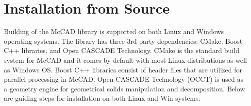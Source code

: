 \documentclass[12pt, a4paper, titlepage]{article}
\begin{document}
\section{Installation from Source} \label{sec:Installation from Source}
Building of the McCAD library is supported on both Linux and Windows operating systems. The library has three 3rd-party dependencies: CMake, Boost C++ libraries, and Open CASCADE Technology. CMake is the standard build system for McCAD and it comes by default with most Linux distributions as well as Windows OS. Boost C++ libraries consist of header files that are utilized for parallel processing in McCAD. Open CASCADE Technology (OCCT) is used as a geometry engine for geometrical solids manipulation and decomposition. Below are guiding steps for installation on both Linux and Win systems. 
\end{document}
